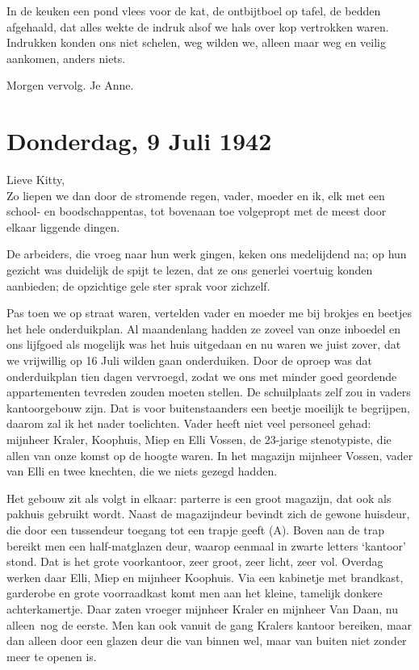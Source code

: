 \documentclass{book}
\begin{document}
In de keuken een pond vlees voor de kat, de ontbijtboel op tafel, de bedden
afgehaald, dat alles wekte de indruk alsof we hals over kop vertrokken waren.
Indrukken konden ons niet schelen, weg wilden we, alleen maar weg en veilig
aankomen, anders niets.

Morgen vervolg. Je Anne.

\section*{Donderdag, 9 Juli 1942}

Lieve Kitty,\\
Zo liepen we dan door de stromende regen, vader, moeder en ik,
elk met een school- en boodschappentas, tot bovenaan toe volgepropt met de meest
door elkaar liggende dingen.

De arbeiders, die vroeg naar hun werk gingen, keken ons medelijdend na; op hun
gezicht was duidelijk de spijt te lezen, dat ze ons generlei voertuig konden
aanbieden; de opzichtige gele ster sprak voor zichzelf.

Pas toen we op straat waren, vertelden vader en moeder me bij brokjes en beetjes
het hele onderduikplan. Al maandenlang hadden ze zoveel van onze inboedel en ons
lijfgoed als mogelijk was het huis uitgedaan en nu waren we juist zover, dat we
vrijwillig op 16 Juli wilden gaan onderduiken.  Door de oproep was dat
onderduikplan tien dagen vervroegd, zodat we ons met minder goed geordende
appartementen tevreden zouden moeten stellen.  De schuilplaats zelf zou in
vaders kantoorgebouw zijn. Dat is voor buitenstaanders een beetje moeilijk te
begrijpen, daarom zal ik het nader toelichten. Vader heeft niet veel personeel
gehad: mijnheer Kraler, Koophuis, Miep en Elli Vossen, de 23-jarige
stenotypiste, die allen van onze komst op de hoogte waren. In het magazijn
mijnheer Vossen, vader van Elli en twee knechten, die we niets gezegd hadden.

Het gebouw zit als volgt in elkaar: parterre is een groot magazijn, dat ook als
pakhuis gebruikt wordt. Naast de magazijndeur bevindt zich de gewone huisdeur,
die door een tussendeur toegang tot een trapje geeft (A). Boven aan de trap
bereikt men een half-matglazen deur, waarop eenmaal in zwarte letters `kantoor'
stond. Dat is het grote voorkantoor, zeer groot, zeer licht, zeer vol. Overdag
werken daar Elli, Miep en mijnheer Koophuis. Via een kabinetje met brandkast,
garderobe en grote voorraadkast komt men aan het kleine, tamelijk donkere
achterkamertje.  Daar zaten vroeger mijnheer Kraler en mijnheer Van Daan, nu
alleen~nog de eerste. Men kan ook vanuit de gang Kralers kantoor bereiken, maar
dan alleen door een glazen deur die van binnen wel, maar van buiten niet zonder
meer te openen is.
\end{document}
